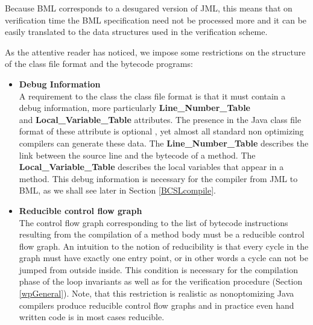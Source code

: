\begin{itemize}
      Because BML corresponds to a desugared version of JML, this means that on verification time the BML specification need not
      be processed more and it can be easily translated to the data structures used in the verification scheme.
      
\end{itemize}



As the attentive reader has noticed, we impose some restrictions on the structure of the class file format and the bytecode programs:
 


\begin{itemize}
  \item \textbf{Debug Information} \\ 
       A requirement to the class the class file format is that it must contain a debug information, more particularly
       \textbf{Line\_Number\_Table} \\ 
       and \textbf{Local\_Variable\_Table}  attributes. The presence in the Java class file format of 
       these attribute is optional \cite{VMSpec}, yet almost all standard non optimizing compilers can generate these data. 
       The \textbf{Line\_Number\_Table} describes the link between the source line and the bytecode of a method.  
       The \textbf{Local\_Variable\_Table} describes the local variables that appear in a method.  
       This debug information is necessary for the compiler from JML to BML, as we shall see later in Section \ref{BCSLcompile}.

\item  \textbf{Reducible control flow graph} \\ 
       The control flow graph corresponding to the list of bytecode instructions resulting from the compilation of a method
       body must be a reducible control flow graph. An intuition to the notion of reducibility is that every cycle in the
       graph must have exactly one entry point, 
       or in other words a cycle can not be jumped from outside inside. This condition is necessary for the compilation
       phase of the loop  invariants as well as for the verification procedure (Section \ref{wpGeneral}).
       Note, that this restriction is realistic as nonoptomizing Java compilers produce
       reducible control flow graphs and in  practice even hand written code is in most cases reducible. 
\end{itemize}





